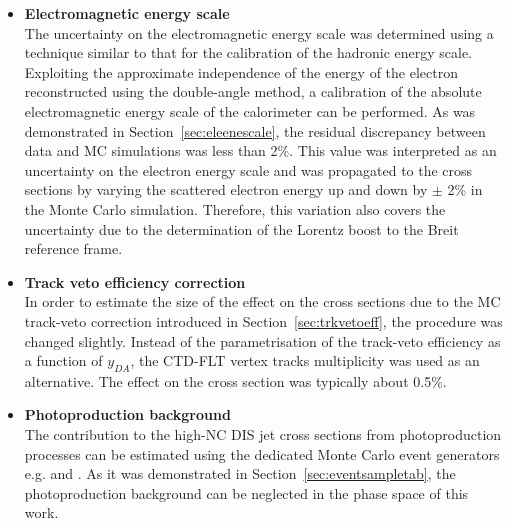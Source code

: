 \begin{itemize}
	\item \textbf{Electromagnetic energy scale}\\
		The uncertainty on the electromagnetic energy scale was determined using a technique similar to that for the calibration of the hadronic energy scale. Exploiting the approximate independence of the energy of the electron reconstructed using the double-angle method, a calibration of the absolute electromagnetic energy scale of the calorimeter can be performed. As was demonstrated in Section~\ref{sec:eleenescale}, the residual discrepancy between data and MC simulations was less than 2\%. This value was interpreted as an uncertainty on the electron energy scale and was propagated to the cross sections by varying the scattered electron energy up and down by $\pm$ 2\% in the Monte Carlo simulation. Therefore, this variation also covers the uncertainty due to the determination of the Lorentz boost to the Breit reference frame. 
	
	\item \textbf{Track veto efficiency correction}\\
		In order to estimate the size of the effect on the cross sections due to the MC track-veto correction introduced in Section~\ref{sec:trkvetoeff}, the procedure was changed slightly. Instead of the parametrisation of the track-veto efficiency as a function of $y_{DA}$, the CTD-FLT vertex tracks multiplicity was used as an alternative. The effect on the cross section was typically about 0.5\%.
	
	\item \textbf{Photoproduction background}\\
		The contribution to the high-\qsq NC DIS jet cross sections from photoproduction processes can be estimated using the dedicated Monte Carlo event generators e.g. \pythia and \herwig. As it was demonstrated in Section~\ref{sec:eventsampletab}, the photoproduction background can be neglected in the phase space of this work.
	

\end{itemize}
